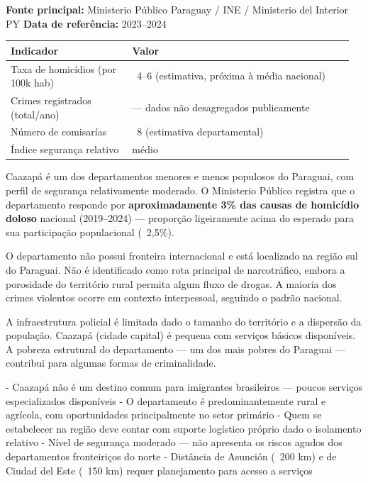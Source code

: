 \textbf{Fonte principal:} Ministerio Público Paraguay / INE / Ministerio del Interior PY
\textbf{Data de referência:} 2023--2024


{\small
\setlength{\tabcolsep}{3pt}
\renewcommand{\arraystretch}{1.12}
\begin{tabularx}{\linewidth}{>{\raggedright\arraybackslash}p{0.34\linewidth} >{\raggedright\arraybackslash}p{0.62\linewidth}}
\toprule
Indicador & Valor \\
\midrule
Taxa de homicídios (por 100k hab) & ~4--6 (estimativa, próxima à média nacional) \\
Crimes registrados (total/ano) & --- dados não desagregados publicamente \\
Número de comisarías & ~8 (estimativa departamental) \\
Índice segurança relativo & médio \\
\bottomrule
\end{tabularx}
}


Caazapá é um dos departamentos menores e menos populosos do Paraguai, com perfil de segurança relativamente moderado. O Ministerio Público registra que o departamento responde por \textbf{aproximadamente 3\% das causas de homicídio doloso} nacional (2019--2024) --- proporção ligeiramente acima do esperado para sua participação populacional (~2,5\%).

O departamento não possui fronteira internacional e está localizado na região sul do Paraguai. Não é identificado como rota principal de narcotráfico, embora a porosidade do território rural permita algum fluxo de drogas. A maioria dos crimes violentos ocorre em contexto interpessoal, seguindo o padrão nacional.

A infraestrutura policial é limitada dado o tamanho do território e a dispersão da população. Caazapá (cidade capital) é pequena com serviços básicos disponíveis. A pobreza estrutural do departamento --- um dos mais pobres do Paraguai --- contribui para algumas formas de criminalidade.


- Caazapá não é um destino comum para imigrantes brasileiros --- poucos serviços especializados disponíveis
- O departamento é predominantemente rural e agrícola, com oportunidades principalmente no setor primário
- Quem se estabelecer na região deve contar com suporte logístico próprio dado o isolamento relativo
- Nível de segurança moderado --- não apresenta os riscos agudos dos departamentos fronteiriços do norte
- Distância de Asunción (~200 km) e de Ciudad del Este (~150 km) requer planejamento para acesso a serviços




